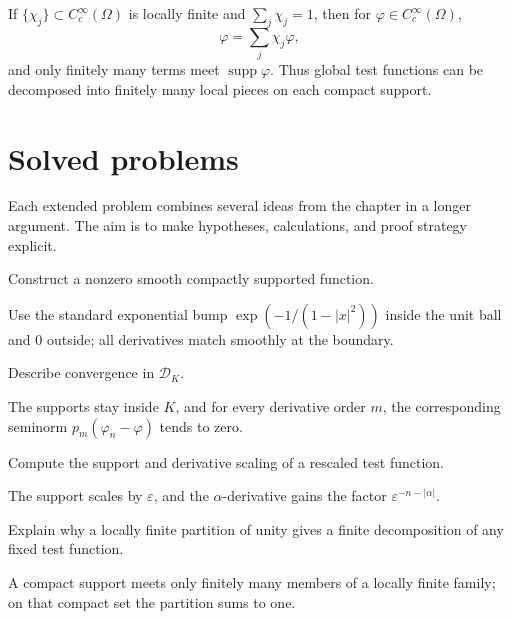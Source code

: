 \begin{example}\label{ex:iii15-worked-04}
If \(\{\chi_j\}\subset C_c^\infty(\Omega)\) is locally finite and
\(\sum_j\chi_j=1\), then for \(\varphi\in C_c^\infty(\Omega)\),
\[
\varphi=\sum_j\chi_j\varphi,
\]
and only finitely many terms meet \(\operatorname{supp}\varphi\). Thus global
test functions can be decomposed into finitely many local pieces on each
compact support.
\end{example}

\section{Solved problems}
Each extended problem combines several ideas from the chapter in a longer argument. The aim is to make hypotheses, calculations, and proof strategy explicit.

\begin{problem}\label{prob:iii15-problem-01}
Construct a nonzero smooth compactly supported function.
\end{problem}
\begin{solution}
Use the standard exponential bump
\(\exp(-1/(1-|x|^2))\) inside the unit ball and \(0\) outside; all derivatives
match smoothly at the boundary.
\end{solution}

\begin{problem}\label{prob:iii15-problem-02}
Describe convergence in \(\mathcal D_K\).
\end{problem}
\begin{solution}
The supports stay inside \(K\), and for every derivative order \(m\), the
corresponding seminorm \(p_m(\varphi_n-\varphi)\) tends to zero.
\end{solution}

\begin{problem}\label{prob:iii15-problem-03}
Compute the support and derivative scaling of a rescaled test function.
\end{problem}
\begin{solution}
The support scales by \(\varepsilon\), and the \(\alpha\)-derivative gains
the factor \(\varepsilon^{-n-|\alpha|}\).
\end{solution}

\begin{problem}\label{prob:iii15-problem-04}
Explain why a locally finite partition of unity gives a finite decomposition of any fixed test function.
\end{problem}
\begin{solution}
A compact support meets only finitely many members of a locally finite
family; on that compact set the partition sums to one.
\end{solution}

